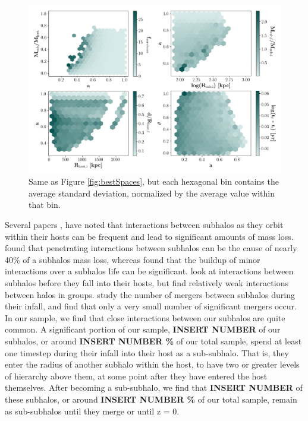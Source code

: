 \documentclass[fleqn,usenatbib]{mnras}
\newcommand\edits[1]{{\color{red}#1}}
\begin{document}
\begin{figure}
	\includegraphics[width=\textwidth]{Figures/stdev_bestSpaces}
	\vspace{-20pt}
    \caption{Same as Figure \ref{fig:bestSpaces}, but each hexagonal bin contains the average standard deviation, normalized by the average value within that bin.}
    \label{fig:stdev_bestSpaces}
\end{figure}

Several papers \citet{Angulo2009}, have noted that interactions between subhalos as they orbit within their hosts can be frequent and lead to significant amounts of mass loss. \citet{Tormen1998} found that penetrating interactions between subhalos can be the cause of nearly 40\% of a subhalos mass loss, whereas \citet{Knebe2005} found that the buildup of minor interactions over a subhalos life can be significant. \citet{Klimentowski2010} look at interactions between subhalos before they fall into their hosts, but find relatively weak interactions between halos in groups. \citet{Angulo2009} study the number of mergers between subhalos during their infall, and find that only a very small number of significant mergers occur. In our sample, we find that close interactions between our subhalos are quite common. A significant portion of our sample, \edits{\textbf{INSERT NUMBER}} of our subhalos, or around \edits{\textbf{INSERT NUMBER \%}} of our total sample, spend at least one timestep during their infall into their host as a sub-subhalo. That is, they enter the radius of another subhalo within the host, to have two or greater levels of hierarchy above them, at some point after they have entered the host themselves. After becoming a sub-subhalo, we find that \edits{\textbf{INSERT NUMBER}} of these subhalos, or around \edits{\textbf{INSERT NUMBER \%}} of our total sample, remain as sub-subhalos until they merge or until z = 0.
\end{document}
